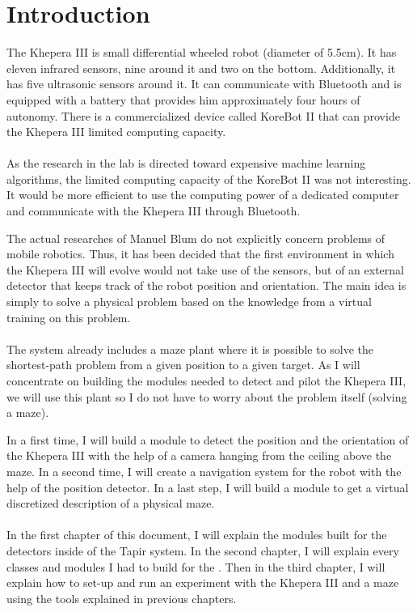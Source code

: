 \chapter{Introduction}

The Khepera III is small differential wheeled robot (diameter of 5.5cm). 
It has eleven infrared sensors, nine around it and two on the bottom. 
Additionally, it has five ultrasonic sensors around it. It can communicate 
with Bluetooth and is equipped with a battery that provides him 
approximately four hours of autonomy. There is a commercialized device 
called KoreBot II that can provide the Khepera III limited computing 
capacity. 
\\
\\
As the research in the lab is directed toward expensive machine learning 
algorithms, the limited computing capacity of the KoreBot II was not 
interesting. It would be more efficient to use the computing power of 
a dedicated computer and communicate with the Khepera III through 
Bluetooth.

The actual researches of Manuel Blum do not explicitly concern problems 
of mobile robotics. Thus, it has been decided that the first environment 
in which the Khepera III will evolve would not take use of the sensors, 
but of an external detector that keeps track of the robot position and 
orientation. The main idea is simply to solve a physical problem based 
on the knowledge from a virtual training on this problem.
\\
\\
The \clsquare system already includes a maze plant where it is possible 
to solve the shortest-path problem from a given position to a given 
target. As I will concentrate on building the modules needed to detect 
and pilot the Khepera III, we will use this plant so I do not have to 
worry about the problem itself (solving a maze).

In a first time, I will build a module to detect the position and the 
orientation of the Khepera III with the help of a camera hanging from 
the ceiling above the maze. In a second time, I will create a navigation 
system for the robot with the help of the position detector. In a last 
step, I will build a module to get a virtual discretized description of 
a physical maze.
\\
\\
In the first chapter of this document, I will explain the modules built 
for the detectors inside of the Tapir system. In the second chapter, 
I will explain every classes and modules I had to build for the \clsquare. 
Then in the third chapter, I will explain how to set-up and run an 
experiment with the Khepera III and a maze using the tools explained 
in previous chapters. 
